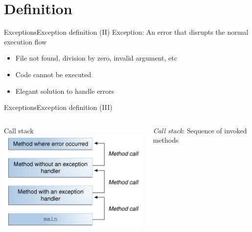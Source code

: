 \documentclass[10pt,compress]{beamer} %
\begin{document}
\section{Definition}

\begin{frame}[fragile]{Exceptions}{Exception definition (II)}
	\alert{Exception}: An error that disrupts the normal execution flow
	\begin{itemize}
		\item File not found, division by zero, invalid argument, etc
		\item Code cannot be executed
		\item Elegant solution to handle errors
	\end{itemize}
\end{frame}

\begin{frame}{Exceptions}{Exception definition (III)}
    \begin{columns}
		\centering Call stack
		\centering \includegraphics[width=0.8\linewidth]{figs/exceptions-callstack.png}

		\textit{Call stack}: Sequence of invoked methods
	\end{columns}
\end{frame}
\end{document}
